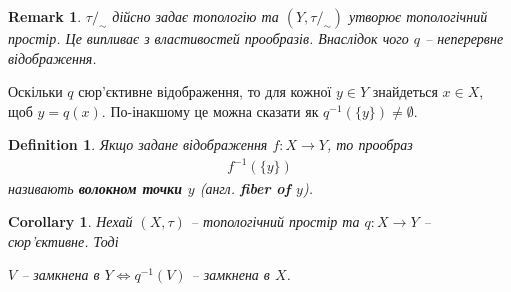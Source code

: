 \documentclass[a4paper, 10pt]{article}
\theoremstyle{theoremdd}
\newtheorem{definition}[theorem]{Definition}
\newtheorem{remark}[theorem]{Remark}
\newtheorem{corollary}[theorem]{Corollary}
\begin{document}
\begin{remark}
$\tau/_{\sim}$ дійсно задає топологію та $(Y,\tau/_{\sim})$ утворює топологічний простір. Це випливає з властивостей прообразів. Внаслідок чого $q$ -- неперервне відображення.
\end{remark}
\noindent
Оскільки $q$ сюр'єктивне відображення, то для кожної $y \in Y$ знайдеться $x \in X$, щоб $y = q(x)$. По-інакшому це можна сказати як $q^{-1}(\{y\}) \neq \emptyset$.
\begin{figure}[H]
\centering
{}
\end{figure}

\begin{definition}
Якщо задане відображення $f \colon X \to Y$, то прообраз
\begin{align*}
f^{-1}(\{y\})
\end{align*}
називають \textbf{волокном точки $y$} (англ. \textbf{fiber of $y$}).
\end{definition}

\begin{corollary}
Нехай $(X,\tau)$ -- топологічний простір та $q \colon X \to Y$ -- сюр'єктивне. Тоді
\begin{center}
$V$ -- замкнена в $Y \iff q^{-1}(V)$ -- замкнена в $X$. 
\end{center}
\end{corollary}
\end{document}
